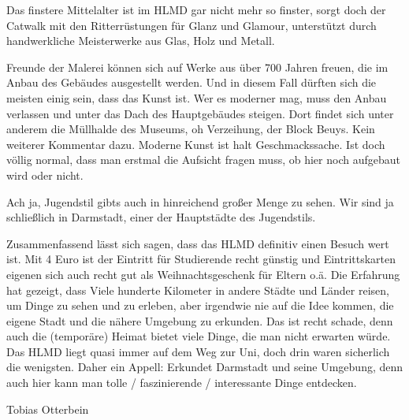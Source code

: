 {Das finstere Mittelalter ist im HLMD gar nicht mehr so finster, sorgt doch der Catwalk mit den Ritterrüstungen für Glanz und Glamour, unterstützt durch handwerkliche Meisterwerke aus Glas, Holz und Metall.

Freunde der Malerei können sich auf Werke aus über 700 Jahren freuen, die im Anbau des Gebäudes ausgestellt werden. Und in diesem Fall dürften sich die meisten einig sein, dass das Kunst ist. Wer es moderner mag, muss den Anbau verlassen und unter das Dach des Hauptgebäudes steigen. Dort findet sich unter anderem die Müllhalde des Museums, oh Verzeihung, der Block Beuys. Kein weiterer Kommentar dazu. Moderne Kunst ist halt Geschmackssache. Ist doch völlig normal, dass man erstmal die Aufsicht fragen muss, ob hier noch aufgebaut wird oder nicht.

Ach ja, Jugendstil gibts auch in hinreichend großer Menge zu sehen. Wir sind ja schließlich in Darmstadt, einer der Hauptstädte des Jugendstils.

Zusammenfassend lässt sich sagen, dass das HLMD definitiv einen Besuch wert ist. Mit 4 Euro ist der Eintritt für Studierende recht günstig und Eintrittskarten eigenen sich auch recht gut als Weihnachtsgeschenk für Eltern o.ä. Die Erfahrung hat gezeigt, dass Viele hunderte Kilometer in andere Städte und Länder reisen, um Dinge zu sehen und zu erleben, aber irgendwie nie auf die Idee kommen, die eigene Stadt und die nähere Umgebung zu erkunden. Das ist recht schade, denn auch die (temporäre) Heimat bietet viele Dinge, die man nicht erwarten würde. Das HLMD liegt quasi immer auf dem Weg zur Uni, doch drin waren sicherlich die wenigsten. Daher ein Appell: Erkundet Darmstadt und seine Umgebung, denn auch hier kann man tolle / faszinierende / interessante Dinge entdecken.}{Tobias Otterbein}

